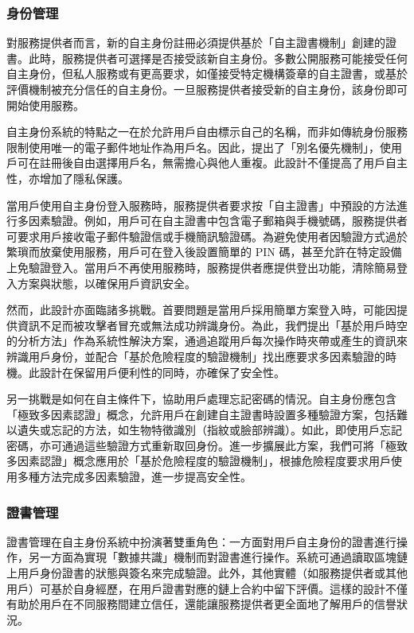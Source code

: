 \subsubsection{身份管理}
對服務提供者而言，新的自主身份註冊必須提供基於「自主證書機制」創建的證書。此時，服務提供者可選擇是否接受該新自主身份。多數公開服務可能接受任何自主身份，但私人服務或有更高要求，如僅接受特定機構簽章的自主證書，或基於評價機制被充分信任的自主身份。一旦服務提供者接受新的自主身份，該身份即可開始使用服務。

自主身份系統的特點之一在於允許用戶自由標示自己的名稱，而非如傳統身份服務限制使用唯一的電子郵件地址作為用戶名。因此，提出了「別名優先機制」，使用戶可在註冊後自由選擇用戶名，無需擔心與他人重複。此設計不僅提高了用戶自主性，亦增加了隱私保護。

當用戶使用自主身份登入服務時，服務提供者要求按「自主證書」中預設的方法進行多因素驗證。例如，用戶可在自主證書中包含電子郵箱與手機號碼，服務提供者可要求用戶接收電子郵件驗證信或手機簡訊驗證碼。為避免使用者因驗證方式過於繁瑣而放棄使用服務，用戶可在登入後設置簡單的 PIN 碼，甚至允許在特定設備上免驗證登入。當用戶不再使用服務時，服務提供者應提供登出功能，清除簡易登入方案與狀態，以確保用戶資訊安全。

然而，此設計亦面臨諸多挑戰。首要問題是當用戶採用簡單方案登入時，可能因提供資訊不足而被攻擊者冒充或無法成功辨識身份。為此，我們提出「基於用戶時空的分析方法」作為系統性解決方案，通過追蹤用戶每次操作時夾帶或產生的資訊來辨識用戶身份，並配合「基於危險程度的驗證機制」找出應要求多因素驗證的時機。此設計在保留用戶便利性的同時，亦確保了安全性。

另一挑戰是如何在自主條件下，協助用戶處理忘記密碼的情況。自主身份應包含「極致多因素認證」概念，允許用戶在創建自主證書時設置多種驗證方案，包括難以遺失或忘記的方法，如生物特徵識別（指紋或臉部辨識）。如此，即使用戶忘記密碼，亦可通過這些驗證方式重新取回身份。進一步擴展此方案，我們可將「極致多因素認證」概念應用於「基於危險程度的驗證機制」，根據危險程度要求用戶使用多種方法完成多因素驗證，進一步提高安全性。
\subsubsection{證書管理}
證書管理在自主身份系統中扮演著雙重角色：一方面對用戶自主身份的證書進行操作，另一方面為實現「數據共識」機制而對證書進行操作。系統可通過讀取區塊鏈上用戶身份證書的狀態與簽名來完成驗證。此外，其他實體（如服務提供者或其他用戶）可基於自身經歷，在用戶證書對應的鏈上合約中留下評價。這樣的設計不僅有助於用戶在不同服務間建立信任，還能讓服務提供者更全面地了解用戶的信譽狀況。

